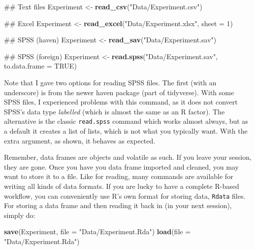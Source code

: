 \documentclass[]{svmono}
\newenvironment{Shaded}{\begin{snugshade}}{\end{snugshade}}
\newcommand{\KeywordTok}[1]{\textcolor[rgb]{0.13,0.29,0.53}{\textbf{#1}}}
\newcommand{\DataTypeTok}[1]{\textcolor[rgb]{0.13,0.29,0.53}{#1}}
\newcommand{\DecValTok}[1]{\textcolor[rgb]{0.00,0.00,0.81}{#1}}
\newcommand{\StringTok}[1]{\textcolor[rgb]{0.31,0.60,0.02}{#1}}
\newcommand{\OtherTok}[1]{\textcolor[rgb]{0.56,0.35,0.01}{#1}}
\newcommand{\NormalTok}[1]{#1}
\begin{document}
\begin{Shaded}
\begin{Highlighting}[]
\NormalTok{## Text files}
\NormalTok{Experiment <-}\StringTok{ }
\StringTok{  }\KeywordTok{read_csv}\NormalTok{(}\StringTok{"Data/Experiment.csv"}\NormalTok{)}

\NormalTok{## Excel}
\NormalTok{Experiment <-}\StringTok{ }
\StringTok{  }\KeywordTok{read_excel}\NormalTok{(}\StringTok{"Data/Experiment.xlsx"}\NormalTok{, }\DataTypeTok{sheet =} \DecValTok{1}\NormalTok{)}

\NormalTok{## SPSS (haven)}
\NormalTok{Experiment <-}\StringTok{ }
\StringTok{  }\KeywordTok{read_sav}\NormalTok{(}\StringTok{"Data/Experiment.sav"}\NormalTok{)}

\NormalTok{## SPSS (foreign)}
\NormalTok{Experiment <-}
\StringTok{  }\KeywordTok{read.spss}\NormalTok{(}\StringTok{"Data/Experiment.sav"}\NormalTok{, }\DataTypeTok{to.data.frame =} \OtherTok{TRUE}\NormalTok{)}
\end{Highlighting}
\end{Shaded}

Note that I gave two options for reading SPSS files. The first (with an
underscore) is from the newer haven package (part of tidyverse). With
some SPSS files, I experienced problems with this command, as it does
not convert SPSS's data type \emph{labelled} (which is almost the same
as an R factor). The alternative is the classic \texttt{read.spss}
command which works almost always, but as a default it creates a list of
lists, which is not what you typically want. With the extra argument, as
shown, it behaves as expected.

Remember, data frames are objects and volatile as such. If you leave
your session, they are gone. Once you have you data frame imported and
cleaned, you may want to store it to a file. Like for reading, many
commands are available for writing all kinds of data formats. If you are
lucky to have a complete R-based workflow, you can conveniently use R's
own format for storing data, \texttt{Rdata} files. For storing a data
frame and then reading it back in (in your next session), simply do:

\begin{Shaded}
\begin{Highlighting}[]
\KeywordTok{save}\NormalTok{(Experiment, }\DataTypeTok{file =} \StringTok{"Data/Experiment.Rda"}\NormalTok{)}
\KeywordTok{load}\NormalTok{(}\DataTypeTok{file =} \StringTok{"Data/Experiment.Rda"}\NormalTok{)}
\end{Highlighting}
\end{Shaded}
\end{document}
